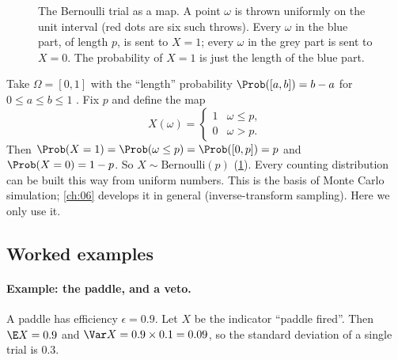 \begin{figure}[htbp]
\centering
{}
\caption{The Bernoulli trial as a map. A point $\omega$ is thrown uniformly on the unit interval (red dots are six such throws). Every $\omega$ in the blue part, of length $p$, is sent to $X=1$; every $\omega$ in the grey part is sent to $X=0$. The probability of $X=1$ is just the length of the blue part.}
\label{2a:fig:bern-omega}
\end{figure}

Take $\Omega=[0,1]$ with the ``length'' probability $\Prob([a,b])=b-a$ for $0\le a\le b\le1$ . Fix $p$ and define the map
\[
  X(\omega)=\begin{cases}1 & \omega\le p,\\ 0 & \omega>p.\end{cases}
\]
Then $\Prob(X=1)=\Prob(\omega\le p)=\Prob([0,p])=p$ and $\Prob(X=0)=1-p$. So $X\sim\mathrm{Bernoulli}(p)$ (\cref{2a:fig:bern-omega}). Every counting distribution can be built this way from uniform numbers. This is the basis of Monte Carlo simulation; \cref{ch:06} develops it in general (inverse-transform sampling). Here we only use it.

\subsection{Worked examples}

\paragraph{Example: the paddle, and a veto.}
A paddle has efficiency $\epsilon=0.9$. Let $X$ be the indicator ``paddle fired''. Then $\E X=0.9$ and $\Var X=0.9\times0.1=0.09$, so the standard deviation of a single trial is $0.3$.

